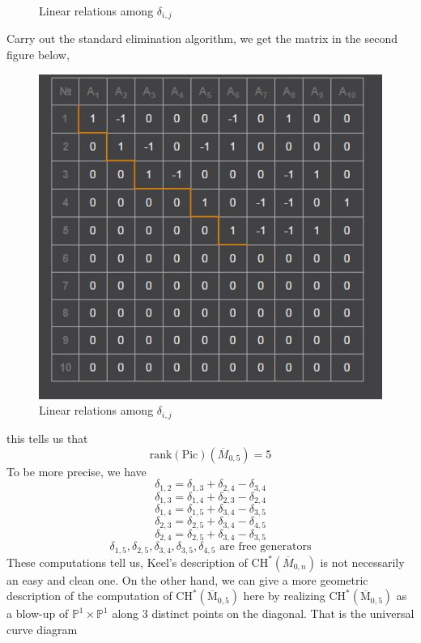 \documentclass[../main.tex]{subfiles}
\begin{document}
\begin{example}
\begin{figure}[h!]
\caption{Linear relations among $\delta_{i,j}$}
\label{Linear relations among boundary divisors}
\end{figure}
Carry out the standard elimination algorithm, we get the matrix in the second figure below,
\begin{figure}[h!]
\centering
\includegraphics[width=\textwidth]{img/matrix2.JPG}
\caption{Linear relations among $\delta_{i,j}$}
\label{Linear relations among boundary divisors}
\end{figure}
this tells us that 
$$\mathrm{rank}(\mathrm{Pic})(\overline{M}_{0,5})=5$$
To be more precise, we have 
$$\delta_{1,2}=\delta_{1,3}+\delta_{2,4}-\delta_{3,4}$$
$$\delta_{1,3}=\delta_{1,4}+\delta_{2,3}-\delta_{2,4}$$
$$\delta_{1,4}=\delta_{1,5}+\delta_{3,4}-\delta_{3,5}$$
$$\delta_{2,3}=\delta_{2,5}+\delta_{3,4}-\delta_{4,5}$$
$$\delta_{2,4}=\delta_{2,5}+\delta_{3,4}-\delta_{3,5}$$
$$\delta_{1,5}, \delta_{2,5},\delta_{3,4},\delta_{3,5},\delta_{4,5}\text{ are free generators}$$
These computations tell us, Keel's description of $\mathrm{CH}^{*}(\overline{M}_{0,n})$ is not necessarily an easy and clean one. On the other hand, we can give a more geometric description of the computation of $\mathrm{CH}^{*}(\overline{\mathrm{M}}_{0,5})$ here by realizing $\mathrm{CH}^{*}(\overline{\mathrm{M}}_{0,5})$ as a blow-up of $\mathbb{P}^{1}\times \mathbb{P}^{1}$ along $3$ distinct points on the diagonal. That is the universal curve diagram 


\end{example}
\end{document}
